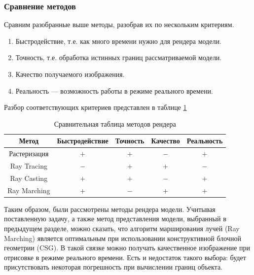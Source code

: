 \subsubsection{Сравнение методов}

Сравним разобранные выше методы, разобрав их по нескольким 
критериям.
\begin{enumerate}[leftmargin=1.6\parindent,label=\arabic*.]
	\item Быстродействие, т.е. как много времени нужно для рендера модели.
	\item Точность, т.е. обработка истинных границ рассматриваемой модели.
	\item Качество получаемого изображения.
	\item Реальность — возможность работы в режиме 
	реального времени.
\end{enumerate}

Разбор соответствующих критериев представлен в таблице \ref{table:presentation}

\begin{table}[h]
	\begin{center}
		\captionsetup{justification=raggedright,singlelinecheck=off,margin=9mm}
		\caption{Сравнительная таблица методов рендера}
		\begin{tabular}{| c | c | c | c | c |}
			\hline
			Метод & Быстродействие & Точность & Качество & Реальность \\
			\hline
			Растеризация &$+$ & $+$ & $-$ & $+$\\
			\hline
			Ray Tracing & $-$ & $+$ & $+$ & $-$\\
			\hline
			Ray Casting  & $+$ & $+$ & $-$ & $+$\\
			\hline
			Ray Marching & $+$ & $-$ & $+$ & $+$\\
			\hline
		\end{tabular}
		\label{table:presentation}
	\end{center}
\end{table}

Таким образом, были рассмотрены методы рендера модели.
Учитывая поставленную задачу, а также метод представления модели, выбранный в предыдущем разделе, можно сказать, что алгоритм марширования лучей (Ray Marching) является оптимальным при использовании конструктивной 
блочной геометрии (CSG). 
В такой связке можно получать качественное 
изображение при отрисовке в режиме реального времени.
Есть и недостаток такого выбора: будет присутствовать некоторая погрешность при вычислении границ объекта.

